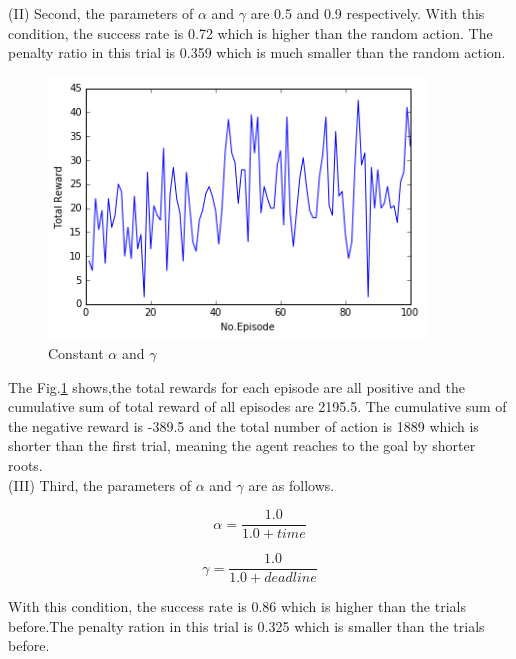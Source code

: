 \documentclass[a4paper,11pt]{article}
\begin{document}
(I\hspace{-.1em}I) Second, the parameters of $\alpha$ and $\gamma$ are 0.5 and 0.9 respectively.
With this condition, the success rate is 0.72 which is higher than the random action. The penalty ratio in this trial is 0.359 which is much smaller than the random action. 

\begin{figure}[H]
\begin{center}
\includegraphics[width=100mm]{graph/constant.jpg}
\end{center}
\caption{Constant $\alpha$ and $\gamma$}
\label{fig:two}
\end{figure}

The Fig.\ref{fig:two} shows,the total rewards for each episode are all positive and the cumulative sum of total reward of all episodes are 2195.5.
The cumulative sum of the negative reward is -389.5 and the total number of action is 1889 which is shorter than the first trial, meaning the agent reaches to the goal by shorter roots.
\\


(I\hspace{-.1em}I\hspace{-.1em}I) Third, the parameters of $\alpha$ and $\gamma$ are as follows.

\begin{equation}
	\alpha=\frac{1.0}{1.0+time}
\end{equation}

\begin{equation}
	\gamma=\frac{1.0}{1.0+deadline}
\end{equation}

With this condition, the success rate is 0.86 which is higher than the trials before.The penalty ration in this trial is 0.325 which is smaller than the trials before.
\end{document}
